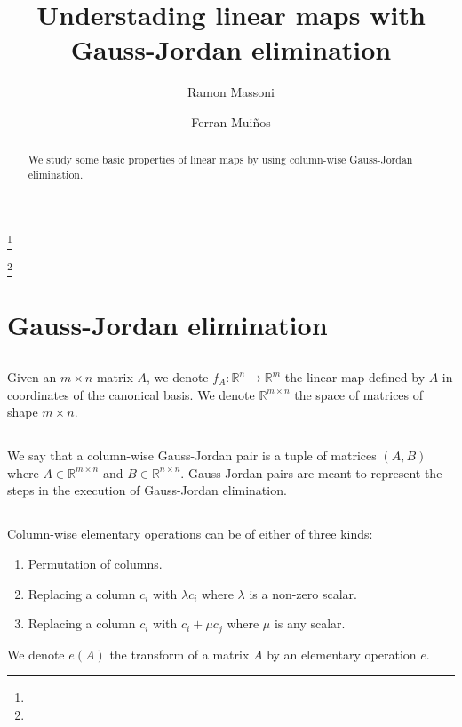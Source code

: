 \documentclass{proc-l}
\theoremstyle{definition}
\theoremstyle{remark}
\numberwithin{equation}{section}
\newcommand{\R}{\mathbb{R}}
\newcommand{\x}{\times}
\begin{document}
\title{Understading linear maps with Gauss-Jordan elimination}


\author{Ramon Massoni}
\address{}
\curraddr{}
\email{}
\thanks{}

\author{Ferran Mui\~nos}
\address{}
\curraddr{}
\email{}
\thanks{}





\begin{abstract}
We study some basic properties of linear maps by using column-wise Gauss-Jordan elimination.
\end{abstract}

\maketitle

\section{Gauss-Jordan elimination}
\subsection{}
Given an $m\x n$ matrix $A$, we denote $f_A:\R^n\to\R^m$ the linear map defined by $A$ in coordinates of the canonical basis. We denote $\R^{m \x n}$ the space of matrices of shape $m\x n$.

\subsection{}
We say that a column-wise Gauss-Jordan pair is a tuple of matrices $(A, B)$ where $A\in\R^{m\x n}$ and $B\in\R^{n\x n}$. Gauss-Jordan pairs are meant to represent the steps in the execution of Gauss-Jordan elimination.

\subsection{}
Column-wise elementary operations can be of either of three kinds:
\begin{enumerate}
\item Permutation of columns.
\item Replacing a column $c_i$ with $\lambda c_i$ where $\lambda$ is a non-zero scalar.
\item Replacing a column $c_i$ with $c_i + \mu c_j$ where $\mu$ is any scalar.
\end{enumerate}
We denote $e(A)$ the transform of a matrix $A$ by an elementary operation $e$.
\end{document}
